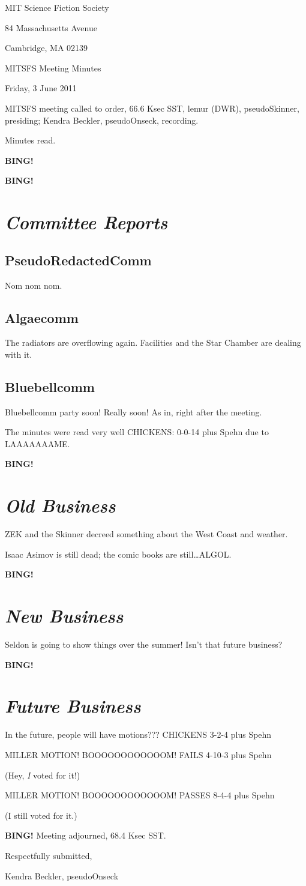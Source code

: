 \documentclass[10pt]{article}
\newcommand{\bing}{{\bf BING!} }
\newcommand{\goto}[1]{\bing \vskip 12pt \section*{{\em{#1}}}}
\newcommand{\ps}{ plus Spehn\xspace}
\newcommand{\skinner}{lemur (DWR), pseudoSkinner}
\newcommand{\onseck}{Kendra Beckler, pseudoOnseck}
\newcommand{\meetingdate}{Friday, 3 June 2011}
\begin{document}
\begin{center}

MIT Science Fiction Society

84 Massachusetts Avenue

Cambridge, MA 02139

\vspace{12pt}

MITSFS Meeting Minutes

\meetingdate

\end{center}

\vspace{18pt}

\setlength{\parskip}{6pt}

\noindent
MITSFS meeting called to order, 66.6 Ksec SST,
\skinner, presiding; \onseck, recording.

Minutes read.

\bing

\goto{Committee Reports}

\subsection*{PseudoRedactedComm}

Nom nom nom.

\subsection*{Algaecomm}

The radiators are overflowing again.  Facilities and the Star Chamber are dealing with it.

\subsection*{Bluebellcomm}

Bluebellcomm party soon!  Really soon!  As in, right after the meeting.

The minutes were read very well CHICKENS: 0-0-14 \ps due to LAAAAAAAME.

\goto{Old Business}

ZEK and the Skinner decreed something about the West Coast and weather.

Isaac Asimov is still dead; the comic books are still\ldots ALGOL.

\goto{New Business}

Seldon is going to show things over the summer!  Isn't that future business?

\goto{Future Business}

In the future, people will have motions??? CHICKENS 3-2-4 \ps

MILLER MOTION!  BOOOOOOOOOOOOM! FAILS 4-10-3 \ps

(Hey, \textit{I} voted for it!)

MILLER MOTION!  BOOOOOOOOOOOOM! PASSES 8-4-4 \ps

(I still voted for it.)

\bing
\noindent
Meeting adjourned, 68.4 Ksec SST.

\vspace{18pt}

\centerline{Respectfully submitted,}
\centerline{\onseck}
\end{document}
